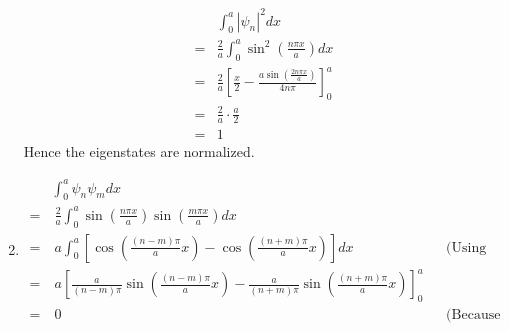 \documentclass[10pt]{article}
\begin{document}
\begin{enumerate}
    \begin{align*}
      & \int_{0}^{a} \left| \psi_n \right|^2 dx \\
      =& \frac{2}{a} \int_{0}^{a} \sin ^2 \left( \frac{n \pi x}{a} \right) dx\\
      =& \frac{2}{a} \left[ \frac{x}{2} - \frac{a \sin \left( \frac{2 n\pi x}{a} \right)}{4 n\pi} \right]_0^a \\
      =& \frac{2}{a} \cdot \frac{a}{2} \\
      =& 1
    \end{align*}
    Hence the eigenstates are normalized.
  \item 
    \begin{align*}
      &\int_{0}^{a} \psi_n \psi_m dx \\
     =&~\frac{2}{a} \int_{0}^{a} \sin \left( \frac{n \pi x}{a} \right) \sin \left( \frac{m \pi x}{a} \right) dx \\ 
     =&~a \int_{0}^{a} \left[ \cos \left( \frac{\left( n-m \right)\pi}{a}x \right) - \cos \left( \frac{\left( n+m \right)\pi}{a}x \right) \right]dx && \text{(Using the trig identity from 1c)} \\
     =&~a \left[ \frac{a}{\left( n-m \right)\pi} \sin \left( \frac{\left( n-m \right)\pi}{a}x \right) - \frac{a}{\left( n+m \right)\pi} \sin \left( \frac{\left( n+m \right)\pi}{a}x \right) \right]_0^a \\
     =&~0 && \text{(Because m and n are integers)}
   \end{align*}
\end{enumerate}
\end{document}
